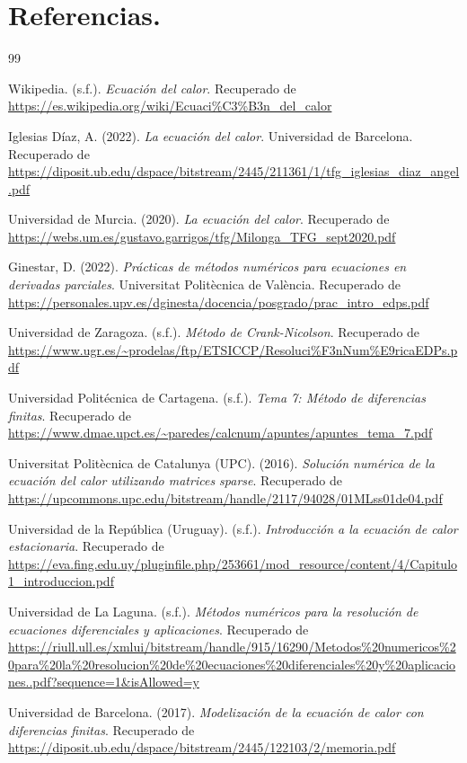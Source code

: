 \documentclass{article}
\begin{document}
\section{Referencias.}
\renewcommand{\refname}{}
\renewcommand{\bibname}{}
\vspace{-10mm}
\begin{thebibliography}{99}

 Wikipedia. (s.f.). \textit{Ecuación del calor}. Recuperado de \url{https://es.wikipedia.org/wiki/Ecuaci%C3%B3n_del_calor}

 Iglesias Díaz, A. (2022). \textit{La ecuación del calor}. Universidad de Barcelona. Recuperado de \url{https://diposit.ub.edu/dspace/bitstream/2445/211361/1/tfg_iglesias_diaz_angel.pdf}

 Universidad de Murcia. (2020). \textit{La ecuación del calor}. Recuperado de \url{https://webs.um.es/gustavo.garrigos/tfg/Milonga_TFG_sept2020.pdf}

 Ginestar, D. (2022). \textit{Prácticas de métodos numéricos para ecuaciones en derivadas parciales}. Universitat Politècnica de València. Recuperado de \url{https://personales.upv.es/dginesta/docencia/posgrado/prac_intro_edps.pdf}


 Universidad de Zaragoza. (s.f.). \textit{Método de Crank-Nicolson}. Recuperado de \url{https://www.ugr.es/~prodelas/ftp/ETSICCP/Resoluci%F3nNum%E9ricaEDPs.pdf}

 Universidad Politécnica de Cartagena. (s.f.). \textit{Tema 7: Método de diferencias finitas}. Recuperado de \url{https://www.dmae.upct.es/~paredes/calcnum/apuntes/apuntes_tema_7.pdf}

 Universitat Politècnica de Catalunya (UPC). (2016). \textit{Solución numérica de la ecuación del calor utilizando matrices sparse}. Recuperado de \url{https://upcommons.upc.edu/bitstream/handle/2117/94028/01MLss01de04.pdf}


 Universidad de la República (Uruguay). (s.f.). \textit{Introducción a la ecuación de calor estacionaria}. Recuperado de \url{https://eva.fing.edu.uy/pluginfile.php/253661/mod_resource/content/4/Capitulo1_introduccion.pdf}

 Universidad de La Laguna. (s.f.). \textit{Métodos numéricos para la resolución de ecuaciones diferenciales y aplicaciones}. Recuperado de \url{https://riull.ull.es/xmlui/bitstream/handle/915/16290/Metodos%20numericos%20para%20la%20resolucion%20de%20ecuaciones%20diferenciales%20y%20aplicaciones..pdf?sequence=1&isAllowed=y}

 Universidad de Barcelona. (2017). \textit{Modelización de la ecuación de calor con diferencias finitas}. Recuperado de \url{https://diposit.ub.edu/dspace/bitstream/2445/122103/2/memoria.pdf}

\end{thebibliography}
\end{document}
